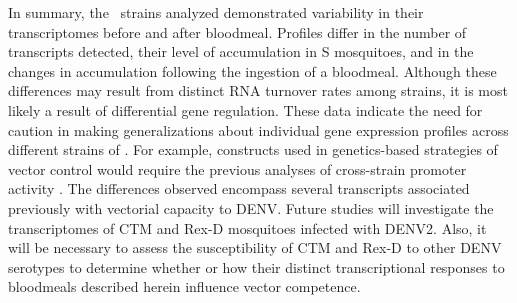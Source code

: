 In summary, the \Aa\ strains analyzed demonstrated variability in their transcriptomes before and after bloodmeal.
Profiles differ in the number of transcripts detected, their level of accumulation in S mosquitoes, and in the changes in accumulation following the ingestion of a bloodmeal.
Although these differences may result from distinct RNA turnover rates among strains, it is most likely a result of differential gene regulation.
These data indicate the need for caution in making generalizations about individual gene expression profiles across different strains of \Aa.
For example, constructs used in genetics-based strategies of vector control would require the previous analyses of cross-strain promoter activity \cite{James2011}.
The differences observed encompass several transcripts associated previously with vectorial capacity to DENV.
Future studies will investigate the transcriptomes of \gls{CTM} and \gls{Rex-D} mosquitoes infected with \gls{DENV2}.
Also, it will be necessary to assess the susceptibility of \gls{CTM} and \gls{Rex-D} to other DENV serotypes to determine whether or how their distinct transcriptional responses to bloodmeals described herein influence vector competence.